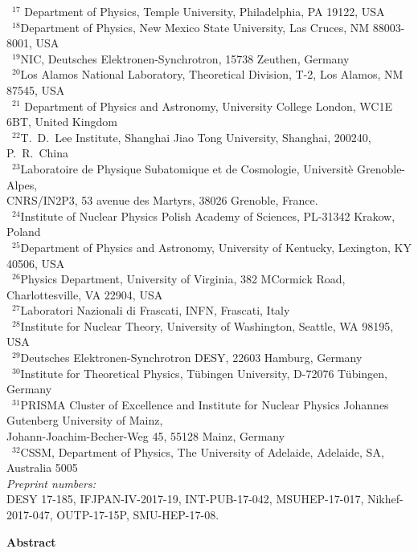 \documentclass[twoside,12pt]{article}
\numberwithin{equation}{section}
\numberwithin{figure}{section}
\numberwithin{table}{section}
\begin{document}
\begin{center}
{~$^{17}$ Department of Physics, 
Temple University, Philadelphia, PA 19122, USA\\
~$^{18}$Department of Physics, 
New Mexico State University, Las Cruces, NM 88003-8001, USA\\
~$^{19}$NIC, Deutsches Elektronen-Synchrotron, 15738 Zeuthen, Germany\\
~$^{20}$Los Alamos National Laboratory, Theoretical Division, 
T-2, Los Alamos, NM 87545, USA\\
~$^{21}$ Department of Physics and Astronomy, 
University College London, WC1E 6BT, United Kingdom\\
~$^{22}$T.~D.~Lee Institute, 
Shanghai Jiao Tong University, Shanghai, 200240, P.~R.~China\\
~$^{23}$Laboratoire de Physique Subatomique et de Cosmologie, 
Universit\`e Grenoble-Alpes,\\ 
CNRS/IN2P3, 53 avenue des Martyrs,  38026 Grenoble, France. \\
~$^{24}$Institute of Nuclear Physics Polish Academy of Sciences, 
PL-31342 Krakow, Poland\\
~$^{25}$Department of Physics and Astronomy, University of Kentucky, 
Lexington, KY 40506, USA\\
~$^{26}$Physics Department, University of Virginia, 382 MCormick Road,
Charlottesville, VA 22904, USA\\
~$^{27}$Laboratori Nazionali di Frascati, INFN, Frascati, Italy\\
~$^{28}$Institute for Nuclear Theory, 
University of Washington, Seattle, WA 98195, USA\\
~$^{29}$Deutsches Elektronen-Synchrotron DESY, 22603 Hamburg, Germany\\
~$^{30}$Institute for Theoretical Physics, 
T\"ubingen University, D-72076 T\"ubingen, Germany\\
~$^{31}$PRISMA Cluster of Excellence and Institute for Nuclear Physics 
Johannes Gutenberg University of Mainz,\\ 
Johann-Joachim-Becher-Weg 45, 55128 Mainz, Germany\\
~$^{32}$CSSM, Department of Physics, 
The University of Adelaide, Adelaide, SA, Australia 5005\\
}
\vspace{0.3cm}
       {\it Preprint numbers:} \\
DESY 17-185,
IFJPAN-IV-2017-19,       
INT-PUB-17-042, 
MSUHEP-17-017, 
Nikhef-2017-047,
OUTP-17-15P,
SMU-HEP-17-08.

\clearpage

{\bf \large Abstract}

\end{center}
\end{document}
